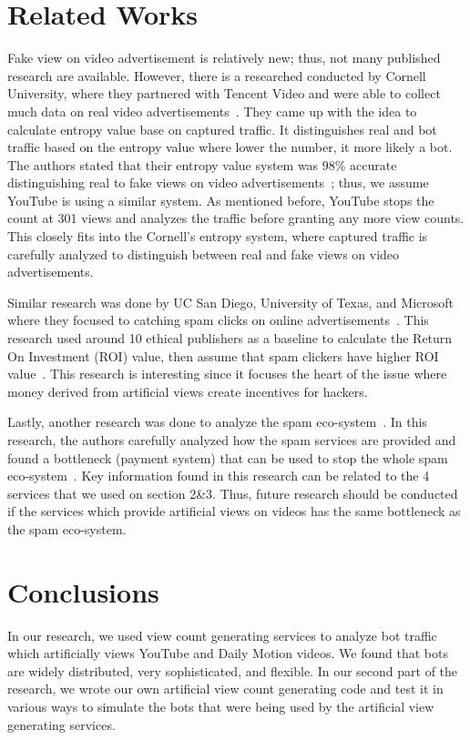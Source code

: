 \documentclass[conference]{IEEEtran}
\begin{document}
\section{Related Works}

Fake view on video advertisement is relatively new; thus, not many published research are available. However, there is a researched conducted by Cornell University, where they partnered with Tencent Video and were able to collect much data on real video advertisements~\cite{c5}. They came up with the idea to calculate entropy value base on captured traffic. It distinguishes real and bot traffic based on the entropy value where lower the number, it more likely a bot. The authors stated that
their entropy value system was 98\% accurate distinguishing real to fake views on video advertisements~\cite{c5}; thus, we assume YouTube is using a similar system. As mentioned before, YouTube stops the count at 301 views and analyzes the traffic before granting any more view counts. This closely fits into the Cornell’s entropy system, where captured traffic is carefully analyzed to distinguish between real and fake views on video advertisements.

Similar research was done by UC San Diego, University of Texas, and Microsoft where they focused to catching spam clicks on online advertisements~\cite{c18}. This research used around 10 ethical publishers as a baseline to calculate the Return On Investment (ROI) value, then assume that spam clickers have higher ROI value~\cite{c18}. This research is interesting since it focuses the heart of the issue where money derived from artificial views create incentives for hackers.

Lastly, another research was done to analyze the spam eco-system~\cite{c18}. In this research, the authors carefully analyzed how the spam services are provided and found a bottleneck (payment system) that can be used to stop the whole spam eco-system~\cite{c18}. Key information found in this research can be related to the 4 services that we used on section 2\&3. Thus, future research should be conducted if the services which provide artificial views on videos has the same bottleneck as the
spam eco-system.


\section{Conclusions}

In our research, we used view count generating services to analyze bot traffic which artificially views YouTube and Daily Motion videos. We found that bots are widely distributed, very sophisticated, and flexible. In our second part of the research, we wrote our own artificial view count generating code and test it in various ways to simulate the bots that were being used by the artificial view generating services.
\end{document}
